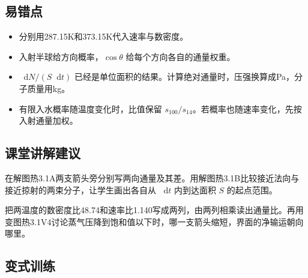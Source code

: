 \documentclass[UTF8,fontset=fandol,a4paper,11pt]{ctexart}
\newcommand{\dd}{\mathop{}\!\mathrm{d}}
\begin{document}


\subsection*{易错点}

\begin{itemize}
\item 分别用287.15K和373.15K代入速率与数密度。
\item 入射半球给方向概率，$\cos\theta$ 给每个方向各自的通量权重。
\item $\dd N/(S\dd t)$ 已经是单位面积的结果。计算绝对通量时，压强换算成Pa，分子质量用kg。
\item 有限入水概率随温度变化时，比值保留 $s_{100}/s_{14}$。若概率也随速率变化，先按入射通量加权。
\end{itemize}



\subsection*{课堂讲解建议}

在解图热3.1A两支箭头旁分别写两向通量及其差。用解图热3.1B比较接近法向与接近掠射的两束分子，让学生画出各自从 $\dd t$ 内到达面积 $S$ 的起点范围。

把两温度的数密度比48.74和速率比1.140写成两列，由两列相乘读出通量比。再用变图热3.1V4讨论蒸气压降到饱和值以下时，哪一支箭头缩短，界面的净输运朝向哪里。



\subsection*{变式训练}
\end{document}
